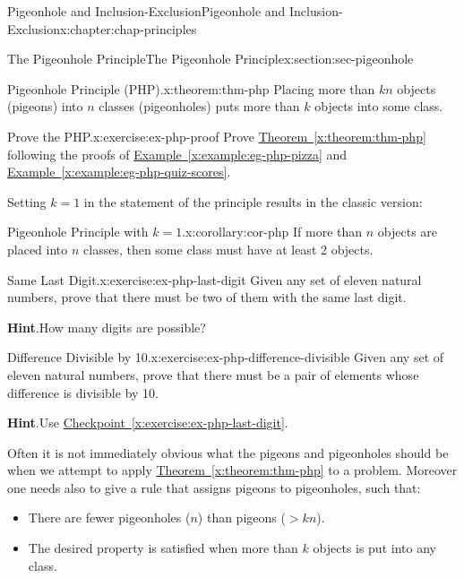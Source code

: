 \documentclass[oneside,10pt,]{book}
\newcommand{\blocktitlefont}{\relax}
\newcommand{\xreffont}{\relax}
\numberwithin{equation}{section}
\newcommand{\gt}{>}
\begin{document}
\begin{chapterptx}{Pigeonhole and Inclusion-Exclusion}{}{Pigeonhole and Inclusion-Exclusion}{}{}{x:chapter:chap-principles}
\begin{sectionptx}{The Pigeonhole Principle}{}{The Pigeonhole Principle}{}{}{x:section:sec-pigeonhole}
\begin{theorem}{Pigeonhole Principle (PHP).}{}{x:theorem:thm-php}%
Placing more than \(kn\) objects (pigeons) into \(n\) classes (pigeonholes) puts more than \(k\) objects into some class.%
\end{theorem}
\begin{inlineexercise}{Prove the PHP.}{x:exercise:ex-php-proof}%
Prove \hyperref[x:theorem:thm-php]{Theorem~{\xreffont\ref{x:theorem:thm-php}}} following the proofs of \hyperref[x:example:eg-php-pizza]{Example~{\xreffont\ref{x:example:eg-php-pizza}}} and \hyperref[x:example:eg-php-quiz-scores]{Example~{\xreffont\ref{x:example:eg-php-quiz-scores}}}.%
\end{inlineexercise}
Setting \(k = 1\) in the statement of the principle results in the classic version:%
\begin{corollary}{Pigeonhole Principle with \(k=1\).}{}{x:corollary:cor-php}%
If more than \(n\) objects are placed into \(n\) classes, then some class must have at least 2 objects.%
\end{corollary}
\begin{inlineexercise}{Same Last Digit.}{x:exercise:ex-php-last-digit}%
Given any set of eleven natural numbers, prove that there must be two of them with the same last digit.%
\par\smallskip%
\noindent\textbf{\blocktitlefont Hint}.\hypertarget{g:hint:id440209}{}\quad{}How many digits are possible?%
\end{inlineexercise}
\begin{inlineexercise}{Difference Divisible by 10.}{x:exercise:ex-php-difference-divisible}%
Given any set of eleven natural numbers, prove that there must be a pair of elements whose difference is divisible by 10.%
\par\smallskip%
\noindent\textbf{\blocktitlefont Hint}.\hypertarget{g:hint:id440407}{}\quad{}Use \hyperref[x:exercise:ex-php-last-digit]{Checkpoint~{\xreffont\ref{x:exercise:ex-php-last-digit}}}.%
\end{inlineexercise}
Often it is not immediately obvious what the pigeons and pigeonholes should be when we attempt to apply \hyperref[x:theorem:thm-php]{Theorem~{\xreffont\ref{x:theorem:thm-php}}} to a problem. Moreover one needs also to give a rule that assigns pigeons to pigeonholes, such that:%
\begin{itemize}[label=\textbullet]
\item{}There are fewer pigeonholes (\(n\)) than pigeons (\(\gt kn\)).%
\item{}The desired property is satisfied when more than \(k\) objects is put into any class.%

\end{itemize}
\end{sectionptx}
\end{chapterptx}
\end{document}
